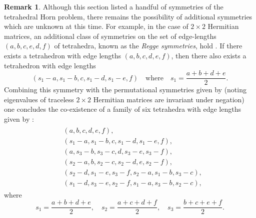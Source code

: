 \documentclass[notitlepage, 11pt, letterpaper]{amsart}
\theoremstyle{plain}
\theoremstyle{definition}
\newtheorem{rem}[thm]{Remark}%
\let\cref\crtcref
\begin{document}
\begin{rem}
    Although this section listed a handful of symmetries of the tetrahedral Horn problem, there remains the possibility of additional symmetries which are unknown at this time.
    For example, in the case of $2\times 2$ Hermitian matrices, an additional class of symmetries on the set of edge-lengths $(a,b,c,e,d,f)$ of tetrahedra, known as the \textit{Regge symmetries}, hold \cite{akopyan2019regge,boalch2007regge,ponzano1968semiclassical}.
    If there exists a tetrahedron with edge lengths $(a,b,c,d,e,f)$, then there also exists a tetrahedron with edge lengths
    \begin{equation}
        (s_1-a,s_1-b,c,s_1-d,s_1-e,f) \quad \text{where} \quad s_1 = \frac{a+b+d+e}{2}.
    \end{equation}
    Combining this symmetry with the permutational symmetries given by \cref{prop:tet_symmetry} (noting eigenvalues of traceless $2 \times 2$ Hermitian matrices are invariant under negation) one concludes the co-existence of a family of six tetrahedra with edge lengths given by \cite[Chapter 9]{varshalovich1988quantum}:
    \begin{align}
        \begin{split}
            &(a,b,c,d,e,f), \\
            &(s_1-a,s_1-b,c,s_1-d,s_1-e,f), \\
            &(a,s_3-b,s_3-c,d,s_3-e,s_3-f), \\
            &(s_2-a,b,s_2-c,s_2-d,e,s_2-f), \\
            &(s_2-d,s_1-e,s_3-f,s_2-a,s_1-b,s_3-c), \\
            &(s_1-d,s_3-e,s_2-f,s_1-a,s_3-b,s_2-c),
        \end{split}
    \end{align}
    where
    \begin{equation}
        s_1 = \frac{a+b+d+e}{2}, \quad
        s_2 = \frac{a+c+d+f}{2}, \quad
        s_3 = \frac{b+c+e+f}{2}.
    \end{equation}
\end{rem}
\end{document}
